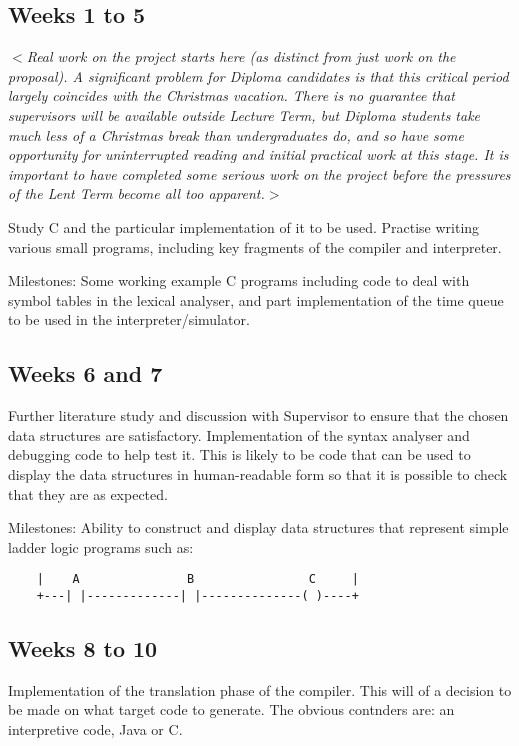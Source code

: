\documentclass[12pt]{article}
\newcommand{\al}{$<$}
\newcommand{\ar}{$>$}
\begin{document}
\subsection*{Weeks 1 to 5}

\al\emph{Real work on the project starts here (as distinct from just
  work on the proposal).  A significant problem for Diploma candidates
  is that this critical period largely coincides with the Christmas
  vacation.  There is no guarantee that supervisors will be available
  outside Lecture Term, but Diploma students take much less of a
  Christmas break than undergraduates do, and so have some opportunity
  for uninterrupted reading and initial practical work at this stage.
  It is important to have completed some serious work on the project
  before the pressures of the Lent Term become all too apparent.}\ar

Study C and the particular implementation of it to be used.  Practise
writing various small programs, including key fragments of the compiler
and interpreter.

Milestones: Some working example C programs including code to deal
with symbol tables in the lexical analyser, and part implementation of
the time queue to be used in the interpreter/simulator.


\subsection*{Weeks 6 and 7}

Further literature study and discussion with Supervisor to ensure that
the chosen data structures are satisfactory.  Implementation of the
syntax analyser and debugging code to help test it.  This is likely to
be code that can be used to display the data structures in
human-readable form so that it is possible to check that they are as
expected.

Milestones: Ability to construct and display data structures that
represent simple ladder logic programs such as:

\begin{verbatim}
    |    A               B                C     |
    +---| |-------------| |--------------( )----+
\end{verbatim}


\subsection*{Weeks 8 to 10}

Implementation of the translation phase of the compiler. This will of
a decision to be made on what target code to generate. The obvious contnders
are: an interpretive code, Java or C.
\end{document}
